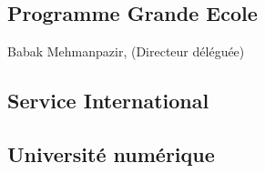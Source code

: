 \documentclass{book}
\begin{document}
\subsection{Programme Grande Ecole}
Babak Mehmanpazir, (Directeur déléguée)

\subsection{Service International}

\subsection{Université numérique}



\appendix
%
\printindex
\end{document}
